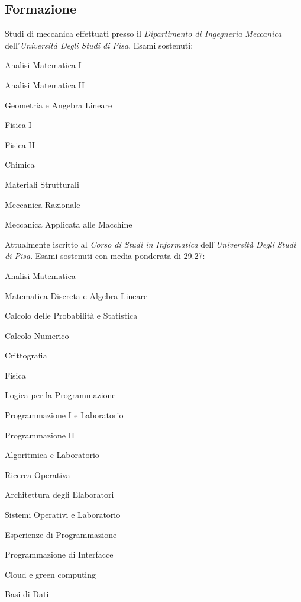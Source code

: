 \documentclass[10pt]{article} %
\begin{document}
\begin{paracol}{2}
\section{Formazione}

Studi di meccanica effettuati presso il \textit{Dipartimento di Ingegneria Meccanica} dell'\textit{Universit\`{a} Degli Studi di Pisa}. Esami sostenuti:
\begin{compactitem}
    \item Analisi Matematica I
    \item Analisi Matematica II
    \item Geometria e Angebra Lineare
    \item Fisica I
    \item Fisica II
    \item Chimica
    \item Materiali Strutturali
    \item Meccanica Razionale
    \item Meccanica Applicata alle Macchine
\end{compactitem}

\medskip
Attualmente iscritto al \textit{Corso di Studi in Informatica} dell'\textit{Universit\`{a} Degli Studi di Pisa}. Esami sostenuti con media ponderata di 29.27:
\begin{compactitem}
    \item Analisi Matematica
    \item Matematica Discreta e Algebra Lineare
    \item Calcolo delle Probabilit\`{a} e Statistica
    \item Calcolo Numerico
    \item Crittografia
    \item Fisica
    \item Logica per la Programmazione
    \item Programmazione I e Laboratorio
    \item Programmazione II
    \item Algoritmica e Laboratorio
    \item Ricerca Operativa
    \item Architettura degli Elaboratori
    \item Sistemi Operativi e Laboratorio
    \item Esperienze di Programmazione
    \item Programmazione di Interfacce
    \item Cloud e green computing
    \item Basi di Dati
\end{compactitem}


\end{paracol}
\end{document}
